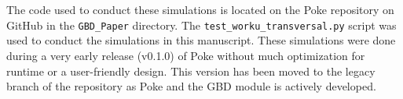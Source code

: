 \section{}

The code used to conduct these simulations is located on the Poke repository on GitHub in the \verb"GBD_Paper" directory. The \verb"test_worku_transversal.py" script was used to conduct the simulations in this manuscript. These simulations were done during a very early release (v0.1.0) of Poke without much optimization for runtime or a user-friendly design. This version has been moved to the legacy branch of the repository as Poke and the GBD module is actively developed. 


